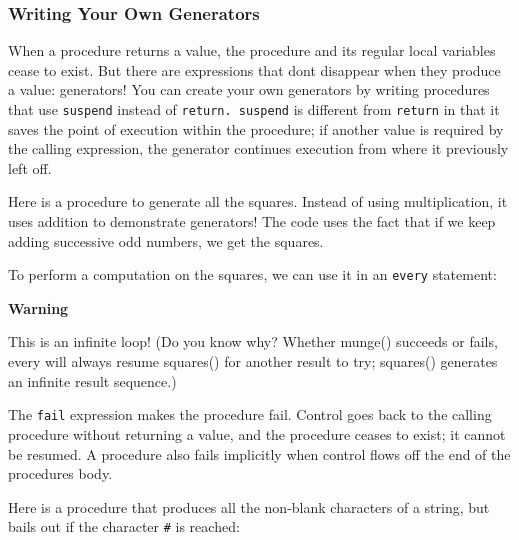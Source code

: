 \subsubsection[Writing Your Own Generators]{Writing Your Own Generators}

When a procedure returns a value, the procedure and its
regular local variables cease to exist. But there are expressions that
don{\textquotesingle}t disappear when they produce a value: generators!
You can create your own generators by writing procedures that use
\texttt{suspend} instead of \texttt{return. suspend} is different from
\texttt{return} in that it saves the point of execution within the
procedure; if another value is required by the calling expression, the
generator continues execution from where it previously left off.

Here is a procedure to generate all the squares. Instead of using
multiplication, it uses addition to demonstrate generators! The code
uses the fact that if we keep adding successive odd numbers, we get the
squares.


To perform a computation on the squares, we can use it in an
\texttt{every} statement:


{\sffamily\bfseries
Warning}

{\sffamily
This is an infinite loop! (Do you know why? Whether munge() succeeds or
fails, \textrm{every} will always resume squares() for another result
to try; squares() generates an infinite result sequence.)}

The \texttt{fail} expression makes the
procedure fail. Control goes back to the calling procedure without
returning a value, and the procedure ceases to exist; it cannot be
resumed. A procedure also fails implicitly when control flows off the
end of the procedure{\textquotesingle}s body.

Here is a procedure that produces all the non-blank characters of a
string, but bails out if the character \texttt{\#} is reached:

